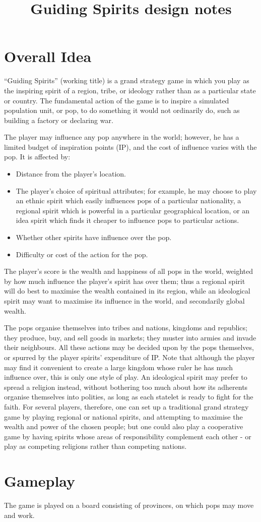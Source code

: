 \documentclass[12pt]{book}
\title{Guiding Spirits design notes}
\begin{document}
\maketitle
\section{Overall Idea}

``Guiding Spirits'' (working title) is a grand strategy game in which you play as the
inspiring spirit of a region, tribe, or ideology rather than as a
particular state or country. The fundamental action of the game is to
inspire a simulated population unit, or pop, to do something it
would not ordinarily do, such as building a factory or declaring
war.

The player may influence any pop anywhere in the world; however, he
has a limited budget of inspiration points (IP), and the cost of
influence varies with the pop. It is affected by:

\begin{itemize}
\item Distance from the player's location.
\item The player's choice of spiritual attributes; for example, he may
  choose to play an ethnic spirit which easily influences pops of a
  particular nationality, a regional spirit which is powerful in a
  particular geographical location, or an idea spirit which finds it
  cheaper to influence pops to particular actions.
\item Whether other spirits have influence over the pop.
\item Difficulty or cost of the action for the pop.
\end{itemize}

The player's score is the wealth and happiness of all pops in the
world, weighted by how much influence the player's spirit has over
them; thus a regional spirit will do best to maximise the wealth
contained in its region, while an ideological spirit may want to
maximise its influence in the world, and secondarily global wealth.

The pops organise themselves into tribes and nations, kingdoms and
republics; they produce, buy, and sell goods in markets; they muster
into armies and invade their neighbours. All these actions may be
decided upon by the pops themselves, or spurred by the player spirits'
expenditure of IP. Note that although the player may find it
convenient to create a large kingdom whose ruler he has much
influence over, this is only one style of play. An ideological spirit
may prefer to spread a religion instead, without bothering too much
about how its adherents organise themselves into polities, as long as
each statelet is ready to fight for the faith. For several players,
therefore, one can set up a traditional grand strategy game by playing
regional or national spirits, and attempting to maximise the wealth
and power of the chosen people; but one could also play a cooperative
game by having spirits whose areas of responsibility complement each
other - or play as competing religions rather than competing nations.

\section{Gameplay}

The game is played on a board consisting of provinces, on which pops
may move and work. 
\end{document}
